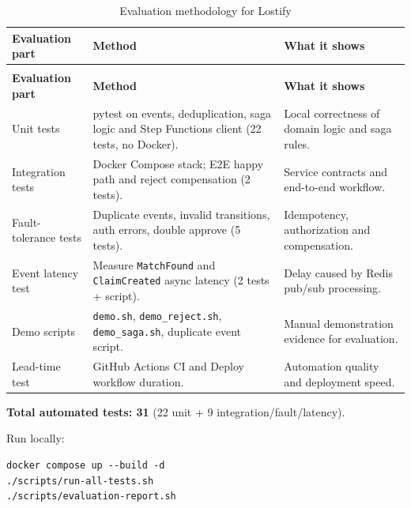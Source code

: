 \documentclass[11pt,a4paper]{article}
\begin{document}
\begin{longtable}{
@{}
>{\raggedright\arraybackslash}p{3.0cm}
>{\raggedright\arraybackslash}p{5.8cm}
>{\raggedright\arraybackslash}p{5.0cm}
@{}
}
\caption{Evaluation methodology for Lostify}
\label{tab:evaluation-methodology} \\

\toprule
\textbf{Evaluation part} & \textbf{Method} & \textbf{What it shows} \\
\midrule
\endfirsthead

\multicolumn{3}{c}{\tablename\ \thetable\ -- continued} \\
\toprule
\textbf{Evaluation part} & \textbf{Method} & \textbf{What it shows} \\
\midrule
\endhead

Unit tests &
pytest on events, deduplication, saga logic and Step Functions client (22 tests, no Docker). &
Local correctness of domain logic and saga rules. \\[0.6em]

Integration tests &
Docker Compose stack; E2E happy path and reject compensation (2 tests). &
Service contracts and end-to-end workflow. \\[0.6em]

Fault-tolerance tests &
Duplicate events, invalid transitions, auth errors, double approve (5 tests). &
Idempotency, authorization and compensation. \\[0.6em]

Event latency test &
Measure \texttt{MatchFound} and \texttt{ClaimCreated} async latency (2 tests + script). &
Delay caused by Redis pub/sub processing. \\[0.6em]

Demo scripts &
\texttt{demo.sh}, \texttt{demo\_reject.sh}, \texttt{demo\_saga.sh}, duplicate event script. &
Manual demonstration evidence for evaluation. \\[0.6em]

Lead-time test &
GitHub Actions CI and Deploy workflow duration. &
Automation quality and deployment speed. \\

\bottomrule
\end{longtable}
\endgroup

\textbf{Total automated tests: 31} (22 unit + 9 integration/fault/latency).

Run locally:
\begin{verbatim}
docker compose up --build -d
./scripts/run-all-tests.sh
./scripts/evaluation-report.sh
\end{verbatim}
\end{document}
